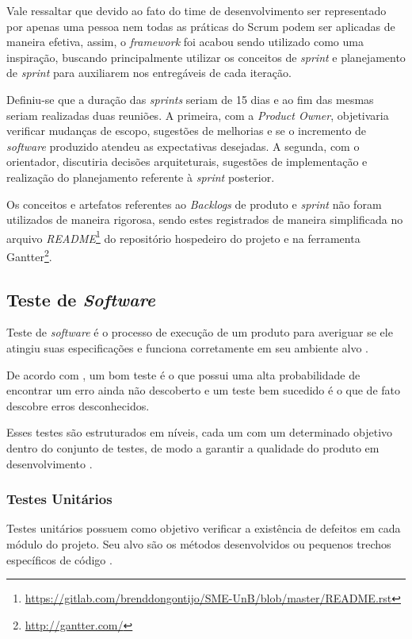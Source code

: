     Vale ressaltar que devido ao fato do time de desenvolvimento ser representado por apenas uma pessoa nem todas as práticas do Scrum podem ser aplicadas de maneira efetiva, assim, o \textit{framework} foi acabou sendo utilizado como uma inspiração, buscando principalmente utilizar
    os conceitos de \textit{sprint} e planejamento de \textit{sprint} para auxiliarem nos entregáveis de cada iteração.

    Definiu-se que a duração das \textit{sprints} seriam de 15 dias e ao fim das mesmas seriam realizadas duas reuniões. A primeira, com a \textit{Product Owner}, objetivaria verificar mudanças de escopo, sugestões de melhorias e se o incremento de \textit{software} produzido atendeu as expectativas desejadas. A segunda,
    com o orientador, discutiria decisões arquiteturais, sugestões de implementação e realização
    do planejamento referente à \textit{sprint} posterior.

    Os conceitos e artefatos referentes ao \textit{Backlogs} de produto e \textit{sprint} não foram utilizados de maneira rigorosa, sendo estes registrados de maneira simplificada no arquivo \textit{README}\footnote{\url{https://gitlab.com/brenddongontijo/SME-UnB/blob/master/README.rst}} do repositório hospedeiro do projeto e na ferramenta Gantter\footnote{\url{http://gantter.com/}}.

    \subsection{Teste de \textit{Software}}
    Teste de \textit{software} é o processo de execução de um produto para averiguar se ele atingiu suas especificações e funciona corretamente em seu ambiente alvo \cite{artigo_intro_teste}.

    De acordo com , um bom teste é o que possui uma alta probabilidade de encontrar um erro ainda não descoberto e um teste bem sucedido é o que de fato descobre erros desconhecidos.

    Esses testes são estruturados em níveis, cada um com um determinado objetivo dentro do conjunto de testes, de modo a garantir a qualidade do produto em desenvolvimento \cite{sw_test_tech}.

        \subsubsection{Testes Unitários}
        Testes unitários possuem como objetivo verificar a existência de defeitos em cada módulo do projeto. Seu alvo são os métodos desenvolvidos ou pequenos trechos específicos de código \cite{artigo_intro_teste}.

